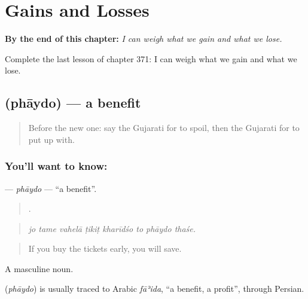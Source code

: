 
\chapter{Gains and Losses}
\label{ch:gu-gains-and-losses}

\begin{chapteropening}
\textbf{By the end of this chapter:} \emph{I can weigh what we gain and what we lose.}

Complete the last lesson of chapter 371: I can weigh what we gain and what we lose.
\end{chapteropening}

\section[\texorpdfstring{\gu{ફાયદો} (phāydo)}{ફાયદો (phāydo)}]{ (phāydo) — a benefit}

\label{lesson:GU-C371-phaydo}



\begin{quote}
Before the new one: say the Gujarati for to spoil, then the Gujarati for to put up with.
\end{quote}

\subsection*{You'll want to know: }
\textbf{} — \emph{phāydo} — \textquotedblleft{}a benefit\textquotedblright{}.

\begin{quote}
       .
\end{quote}

\begin{quote}
\emph{jo tame vahelā ṭikiṭ kharīdśo to phāydo thaśe.}
\end{quote}

\begin{quote}
If you buy the tickets early, you will save.
\end{quote}

A masculine noun.

\begin{cousinweb}
\textbf{} (\emph{phāydo}) is usually traced to Arabic \emph{fāʾida}, \textquotedblleft{}a benefit, a profit\textquotedblright{}, through Persian.
\end{cousinweb}

